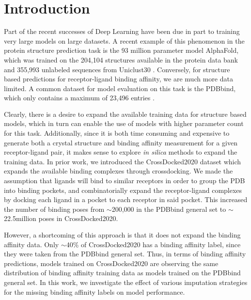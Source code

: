 \documentclass[journal=jmcmar,manuscript=article]{achemso}
\begin{document}
\section{Introduction}

Part of the recent successes of Deep Learning have been due in part to training very large models on large datasets.
A recent example of this phenomenon in the protein structure prediction task is the 93 million parameter model AlphaFold, which was trained on the 204,104 structures available in the protein data bank and 355,993 unlabeled sequences from Uniclust30 \cite{alphafold}.
Conversely, for structure based predictions for receptor-ligand binding affinity, we are much more data limited.
A common dataset for model evaluation on this task is the PDBbind, which only contains a maximum of 23,496 entries \cite{pdbbind2016}.

Clearly, there is a desire to expand the available training data for structure based models, which in turn can enable the use of models with higher parameter count for this task.
Additionally, since it is both time consuming and expensive to generate both a crystal structure and binding affinity measurement for a given receptor-ligand pair, it makes sense to explore \textit{in silica} methods to expand the training data.
In prior work, we introduced the CrossDocked2020 dataset which expands the available binding complexes through crossdocking\cite{crossdocked2020}.
We made the assumption that ligands will bind to similar receptors in order to group the PDB into binding pockets, and combinatorially expand the receptor-ligand complexes by docking each ligand in a pocket to each receptor in said pocket.
This increased the number of binding poses from $\sim$200,000 in the PDBbind general set to $\sim$22.5million poses in CrossDocked2020\cite{crossdocked2020}.

However, a shortcoming of this approach is that it does not expand the binding affinity data.
Only $\sim$40\% of CrossDocked2020 has a binding affinity label, since they were taken from the PDBbind general set.
Thus, in terms of binding affinity predictions, models trained on CrossDocked2020 are observing the same distribution of binding affinity training data as models trained on the PDBbind general set.
In this work, we investigate the effect of various imputation strategies for the missing binding affinity labels on model performance.
\end{document}
